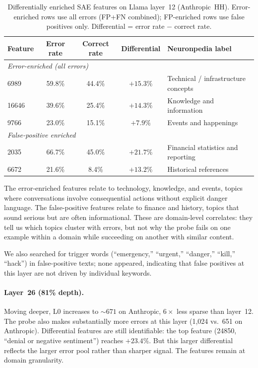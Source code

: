 \documentclass{article}
\begin{document}
\begin{table}[t]
\centering
\caption{Differentially enriched SAE features on Llama layer~12 (Anthropic~HH).
  Error-enriched rows use all errors (FP+FN combined);
  FP-enriched rows use false positives only.
  Differential = error rate $-$ correct rate.}
\label{tab:llama_sae}
\begin{tabular}{lcccp{4.5cm}}
\toprule
Feature & Error rate & Correct rate & Differential & Neuronpedia label \\
\midrule
\multicolumn{5}{l}{\textit{Error-enriched (all errors)}} \\
6989  & 59.8\% & 44.4\% & $+15.3\%$ & Technical / infrastructure concepts \\
16646 & 39.6\% & 25.4\% & $+14.3\%$ & Knowledge and information \\
9766  & 23.0\% & 15.1\% & $+7.9\%$  & Events and happenings \\
\midrule
\multicolumn{5}{l}{\textit{False-positive enriched}} \\
2035  & 66.7\% & 45.0\% & $+21.7\%$ & Financial statistics and reporting \\
6672  & 21.6\% & 8.4\%  & $+13.2\%$ & Historical references \\
\bottomrule
\end{tabular}
\end{table}

The error-enriched features relate to technology, knowledge, and events, topics
where conversations involve consequential actions without explicit danger
language.
The false-positive features relate to finance and history, topics that sound
serious but are often informational.
These are domain-level correlates: they tell us which topics cluster with
errors, but not why the probe fails on one example within a domain while
succeeding on another with similar content.

We also searched for trigger words (``emergency,'' ``urgent,'' ``danger,''
``kill,'' ``hack'') in false-positive texts; none appeared, indicating that
false positives at this layer are not driven by individual keywords.

\paragraph{Layer~26 (81\% depth).}
Moving deeper, L0 increases to ${\sim}671$ on Anthropic, $6\times$ less
sparse than layer~12.
The probe also makes substantially more errors at this layer (1,024 vs.\ 651
on Anthropic).
Differential features are still identifiable: the top feature (24850,
``denial or negative sentiment'') reaches $+23.4\%$. But this larger
differential reflects the larger error pool rather than sharper signal.
The features remain at domain granularity.
\end{document}
